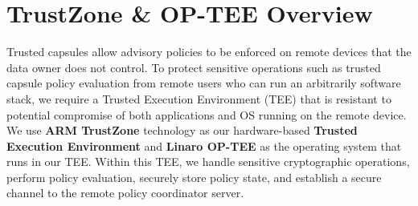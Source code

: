 



\chapter{TrustZone \& OP-TEE Overview}
\label{ch:trustzone}

Trusted capsules allow advisory policies to be enforced on remote devices that the data owner does not
control. To protect sensitive operations such as trusted capsule policy evaluation
from remote users who can run an arbitrarily software stack, we require a Trusted Execution Environment (TEE) that is resistant to potential compromise of both applications and OS running on the remote device. 
We use
\textbf{ARM TrustZone} technology as our hardware-based \textbf{Trusted Execution Environment} 
and \textbf{Linaro OP-TEE} as the operating system that runs in our TEE.
Within this TEE, we handle sensitive cryptographic operations, perform policy evaluation, 
securely store policy state, and establish a secure channel to the remote policy coordinator server. 

